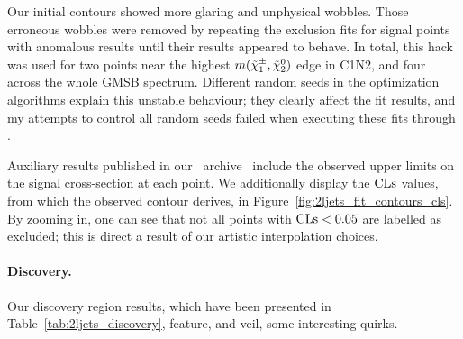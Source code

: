 Our initial contours showed more glaring and unphysical wobbles.
Those erroneous wobbles were removed by repeating the exclusion fits for signal
points with anomalous results until their results appeared to behave.
In total, this hack was used for two points near the highest
$m(\tilde\chi^\pm_1,\tilde\chi^0_2)$ edge in C1N2, and four across the whole
GMSB spectrum.
Different random seeds in the optimization algorithms explain this unstable
behaviour; they clearly affect the fit results, and my attempts to control all
random seeds failed when executing these fits through \histfitter.

Auxiliary results published in our \hepdata\ archive~\cite{hepdata.116034}
include the observed upper limits on the signal cross-section at each point.
We additionally display the $\mathrm{CLs}$ values, from which the observed contour
derives, in Figure~\ref{fig:2ljets_fit_contours_cls}.
By zooming in, one can see that not all points with $\mathrm{CLs} < 0.05$ are
labelled as excluded;
this is direct a result of our artistic interpolation choices.


\paragraph{Discovery.}
Our discovery region results,
which have been presented in Table~\ref{tab:2ljets_discovery},
feature, and veil, some interesting quirks.

